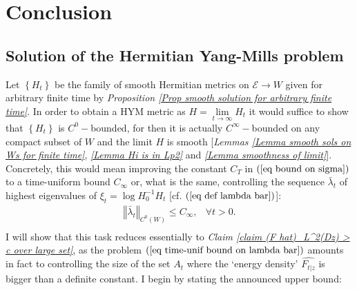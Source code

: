 \documentclass{article}
\begin{document}
\newpage
\section{Conclusion}
 
\subsection{Solution of the Hermitian Yang-Mills problem}
\label{sect time-uniform convergence}

Let $\left\{ H_{t}\right\} $ be the family of smooth Hermitian metrics on $%
\mathcal{E}\rightarrow W$ given for arbitrary finite time by \emph{%
Proposition \ref{Prop smooth solution for arbitrary finite time}}. In order
to obtain a HYM metric as $H=\lim\limits_{t\rightarrow \infty }H_{t}$ it would suffice to show that $\left\{ H_{t}\right\} $ is $C^{0}-$bounded, for then it
is actually $C^{\infty }-$bounded on any compact subset of $W$ and the limit $H$ is
smooth [\emph{Lemmas \ref{Lemma smooth sols on Ws for finite time}}, \emph{%
\ref{Lemma Hi is in Lp2} }and \emph{\ref{Lemma smoothness of limit}}].
Concretely, this would mean improving the constant $C_{T}$ in $\left( \ref%
{eq bound on sigma}\right) $ to a time-uniform bound $C_{\infty }$ or, what is the same, controlling the sequence $\bar{\lambda}_{t}$ of highest
eigenvalues of $\xi _{t}=\log H_{0}^{-1}H_{t}$ [cf. $\left( \ref{eq def
lambda bar}\right) $]:%
\begin{equation}
\boxed{\begin{array}{cr}
\left\Vert \bar{\lambda}_{t}\right\Vert _{C^{0}\left( W\right) }\leq
C_{\infty },& \forall t>0. \\
\end{array}  }\label{eq time-unif bound on lambda bar}
\end{equation}%
I will show that this task reduces essentially to \emph{Claim \ref{claim (F hat)_L^2(Dz) > c  over large set}}, as the problem $\left( \ref{eq time-unif bound on
lambda bar}\right) $ amounts in fact to controlling the size of the set $A_t$ where the `energy density' $\widehat{F_{t\vert z}}$ is bigger than a definite constant.
I begin by stating the announced upper bound:
\end{document}
